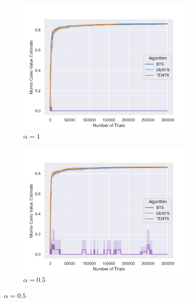             \begin{figure}
                \centering
                
                \begin{subfigure}[b]{0.32\textwidth}
                    \centering
                    \includegraphics[width=\textwidth]{figures/temp/fl_sens/053_fl8_1_0_03.png}
                    \caption{$\alpha=1$}
                \end{subfigure}
                \begin{subfigure}[b]{0.32\textwidth}
                    \centering
                    \includegraphics[width=\textwidth]{figures/temp/fl_sens/054_fl8_0_5_03.png}
                    \caption{$\alpha=0.5$}

\end{subfigure}
\end{figure}
